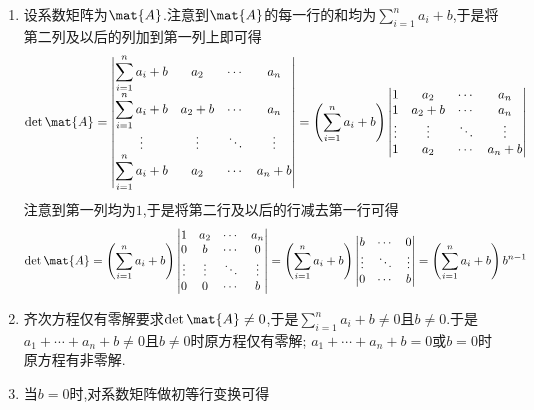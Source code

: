 \documentclass{ctexart}
\begin{document}
\begin{solution}
    \begin{enumerate}[label=\tbf{(\arabic*)},topsep=0pt,parsep=0pt,itemsep=0pt,partopsep=0pt]
        \item 设系数矩阵为$\mat{A}$.注意到$\mat{A}$的每一行的和均为$\displaystyle\sum_{i=1}^{n}a_i+b$,于是将第二列及以后的列加到第一列上即可得
        \[\det\mat{A}=\begin{vmatrix}
            \displaystyle\sum_{i=1}^{n}a_i+b&a_2&\cdots&a_n\\
            \displaystyle\sum_{i=1}^{n}a_i+b&a_2+b&\cdots&a_n\\
            \vdots&\vdots&\ddots&\vdots\\
            \displaystyle\sum_{i=1}^{n}a_i+b&a_2&\cdots&a_n+b\\
        \end{vmatrix}=\left(\sum_{i=1}^{n}a_i+b\right)\begin{vmatrix}
            1&a_2&\cdots&a_n\\
            1&a_2+b&\cdots&a_n\\
            \vdots&\vdots&\ddots&\vdots\\
            1&a_2&\cdots&a_n+b\\
        \end{vmatrix}\]
        注意到第一列均为$1$,于是将第二行及以后的行减去第一行可得
        \[\det\mat{A}=\left(\sum_{i=1}^{n}a_i+b\right)\begin{vmatrix}
            1&a_2&\cdots&a_n\\
            0&b&\cdots&0\\
            \vdots&\vdots&\ddots&\vdots\\
            0&0&\cdots&b\\
        \end{vmatrix}=\left(\sum_{i=1}^{n}a_i+b\right)\begin{vmatrix}
            b&\cdots&0\\
            \vdots&\ddots&\vdots\\
            0&\cdots&b\\
        \end{vmatrix}=\left(\displaystyle\sum_{i=1}^{n}a_i+b\right)b^{n-1}\]
        \item 齐次方程仅有零解要求$\det\mat{A}\neq0$,于是$\displaystyle\sum_{i=1}^{n}a_i+b\neq0$且$b\neq0$.于是$a_1+\cdots+a_n+b\neq0$且$b\neq0$时原方程仅有零解; $a_1+\cdots+a_n+b=0$或$b=0$时原方程有非零解.
        \item 当$b=0$时,对系数矩阵做初等行变换可得

\end{enumerate}
\end{solution}
\end{document}
